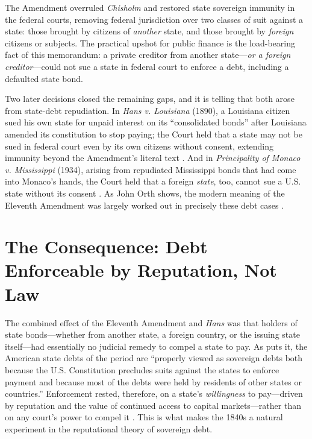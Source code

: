\documentclass[12pt]{article}
\begin{document}
The Amendment overruled \emph{Chisholm} and restored state sovereign immunity in
the federal courts, removing federal jurisdiction over two classes of suit against
a state: those brought by citizens of \emph{another} state, and those brought by
\emph{foreign} citizens or subjects. The practical upshot for public finance is
the load-bearing fact of this memorandum: a private creditor from another
state---\emph{or a foreign creditor}---could not sue a state in federal court to
enforce a debt, including a defaulted state bond.

Two later decisions closed the remaining gaps, and it is telling that both arose
from state-debt repudiation. In \emph{Hans v. Louisiana} (1890), a Louisiana
citizen sued his own state for unpaid interest on its ``consolidated bonds'' after
Louisiana amended its constitution to stop paying; the Court held that a state may
not be sued in federal court even by its own citizens without consent, extending
immunity beyond the Amendment's literal text \citep{hans1890, orth1987judicial}.
And in \emph{Principality of Monaco v. Mississippi} (1934), arising from repudiated
Mississippi bonds that had come into Monaco's hands, the Court held that a foreign
\emph{state}, too, cannot sue a U.S. state without its consent \citep{monaco1934}.
As John Orth shows, the modern meaning of the Eleventh Amendment was largely worked
out in precisely these debt cases \citep{orth1987judicial}.

\section{The Consequence: Debt Enforceable by Reputation, Not Law}
\label{sec:consequence}

The combined effect of the Eleventh Amendment and \emph{Hans} was that holders of
state bonds---whether from another state, a foreign country, or the issuing state
itself---had essentially no judicial remedy to compel a state to pay. As
\citet{english1996understanding} puts it, the American state debts of the period
are ``properly viewed as sovereign debts both because the U.S. Constitution
precludes suits against the states to enforce payment and because most of the
debts were held by residents of other states or countries.'' Enforcement rested,
therefore, on a state's \emph{willingness} to pay---driven by reputation and the
value of continued access to capital markets---rather than on any court's power to
compel it \citep{roberts2010ungovernable, jenks1938migration}. This is what makes
the 1840s a natural experiment in the reputational theory of sovereign debt.
\end{document}
